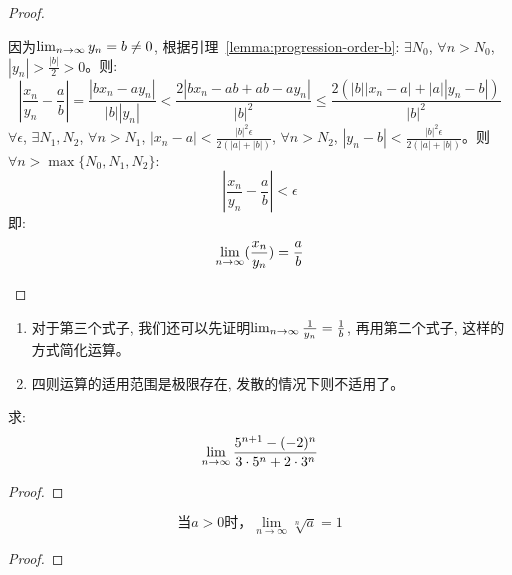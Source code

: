 \begin{proof}
\begin{enumerate}
        因为$\lim_{n \to \infty } y_n = b \neq 0$, 根据引理~\ref{lemma:progression-order-b}: $\exists N_0$, $\forall n > N_0$, $|y_n| > \frac{|b|}{2} > 0$。则:
        \begin{equation*}
            \left|\frac{x_n}{y_n} - \frac{a}{b} \right| = \frac{|bx_n - ay_n|}{|b||y_n|} < \frac{2|bx_n-ab+ab-ay_n|}{|b|^2} \le \frac{2(|b||x_n-a|+|a||y_n-b|)}{|b|^2}
        \end{equation*}
        $\forall \epsilon$, $\exists N_1, N_2$, $\forall n > N_1$, $|x_n - a| < \frac{|b|^2\epsilon}{2(|a|+|b|)}$, $\forall n > N_2$, $|y_n - b| < \frac{|b|^2\epsilon}{2(|a|+|b|)}$。则$\forall n > \max\{N_0, N_1, N_2\}$:
        \begin{equation*}
            \left| \frac{x_n}{y_n} - \frac{a}{b} \right| < \epsilon
        \end{equation*}
        即:
        \begin{equation*}
            \lim_{n \to \infty } (\frac{x_n}{y_n}) = \frac{a}{b}
        \end{equation*}
    \end{enumerate}
\end{proof}
\begin{remark}
    \begin{enumerate}
        \item 对于第三个式子, 我们还可以先证明$\lim_{n \to \infty } \frac{1}{y_n} = \frac{1}{b}$, 再用第二个式子, 这样的方式简化运算。
        \item 四则运算的适用范围是极限存在, 发散的情况下则不适用了。
    \end{enumerate}
\end{remark}

\begin{example}
    求:
    \begin{equation*}
        \lim_{n \to \infty } \frac{5^{n+1}-(-2)^n}{3 \cdot 5^n + 2\cdot 3^n} 
    \end{equation*}
\end{example}
\begin{proof}
    
\end{proof}

\begin{proposition}
    \[\text{当} a > 0 \text{时，} \lim\limits_{n \to \infty} \sqrt[n]{a} = 1 \]
\end{proposition}
\begin{proof}
    
\end{proof}

